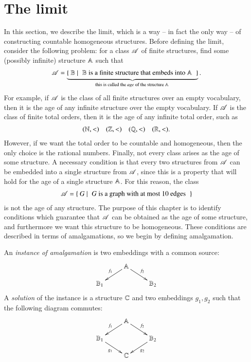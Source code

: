 \section{The \fraisse limit}
\label{sec:fraisse}
In this section, we describe the \fraisse limit, which is a way -- in fact the only way -- of constructing countable homogeneous structures. 
Before defining the \fraisse limit, consider the following problem: for a class $\mathscr A$ of finite structures, find some (possibly infinite) structure $\mathbb A$ such that 
	\begin{align*}
	\structclass = \myunderbrace{\setbuild{\structb}{$\structb$ is a finite structure that embeds into $\structa$}}{this is called the \emph{age} of the structure $\structa$}.
	\end{align*}
For example, if $\mathscr A$ is  the class of all finite structures over an empty vocabulary, then it is the age of any  infinite structure over the empty vocabulary. If $\mathscr A$ is the class of finite total orders, then it is the age of any  infinite total order, such as 
\begin{align*}
({\mathbb N}, <) \quad ({\mathbb Z}, < ) \quad (\mathbb Q, < ) \quad (\mathbb R, < ).
\end{align*}
However, if we want the total order to be countable and homogeneous, then the only choice is the rational numbers. Finally, not every class arises as the age of some structure. A necessary condition  is that every two structures from $\mathscr A$ can be embedded into a single structure from $\mathscr A$, since this is a property that will hold for the age of a single structure $\mathbb A$. For this reason, the class 
\begin{align*}
\structclass  = \setbuild{ G}{$G$ is a graph with at most 10 edges}
\end{align*}
is not the age of any structure.  
The purpose of this chapter is to identify conditions which guarantee that $\mathscr A$ can be obtained as the age of some structure, and furthermore we want this structure to be homogeneous. These conditions are described in terms of amalgamations, so we begin by defining amalgamation. 


\begin{definition}
	[Amalgamation]An \emph{instance of amalgamation} is two embeddings with a common source:
	\begin{equation}
		\label{eq:instance-of-amalgamation}
		\vcenter{\xymatrix @R=1pc {
		& \structa\ar[dl]_{f_1}\ar[dr]^{f_2} \\
		\structb_1 & & \structb_2
		}}
	\end{equation}
	A \emph{solution} of the instance is a structure $\mathbb C$ and two embeddings $g_1,g_2$ such that the following diagram commutes:
	\begin{equation}\label{eq:solution-of-amalgamation}
		\vcenter{\xymatrix @R=1pc {
		& \structa\ar[dl]_{f_1}\ar[dr]^{f_2} \\
		\structb_1\ar[dr]_{g_1} & & \structb_2\ar[dl]^{g_2}\\
		& \structc
		}}	
	\end{equation}	
\end{definition}


